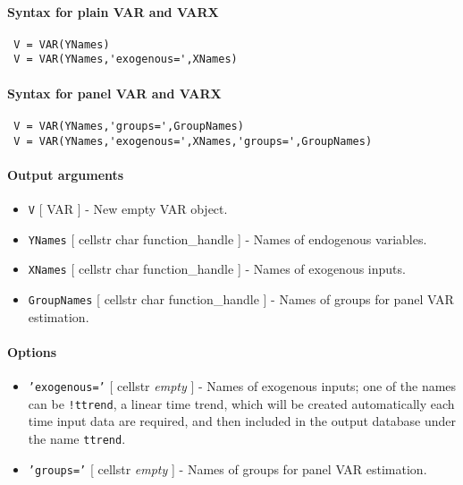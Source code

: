 


	\paragraph{Syntax for plain VAR and VARX}
 
 \begin{verbatim}
 V = VAR(YNames)
 V = VAR(YNames,'exogenous=',XNames)
 \end{verbatim}
 
 \paragraph{Syntax for panel VAR and VARX}
 
 \begin{verbatim}
 V = VAR(YNames,'groups=',GroupNames)
 V = VAR(YNames,'exogenous=',XNames,'groups=',GroupNames)
 \end{verbatim}
 
 \paragraph{Output arguments}
 
 \begin{itemize}
 \item
   \texttt{V} {[} VAR {]} - New empty VAR object.
 \item
   \texttt{YNames} {[} cellstr \textbar{} char \textbar{}
   function\_handle {]} - Names of endogenous variables.
 \item
   \texttt{XNames} {[} cellstr \textbar{} char \textbar{}
   function\_handle {]} - Names of exogenous inputs.
 \item
   \texttt{GroupNames} {[} cellstr \textbar{} char \textbar{}
   function\_handle {]} - Names of groups for panel VAR estimation.
 \end{itemize}
 
 \paragraph{Options}
 
 \begin{itemize}
 \item
   \texttt{'exogenous='} {[} cellstr \textbar{} \emph{empty} {]} - Names
   of exogenous inputs; one of the names can be \texttt{!ttrend}, a
   linear time trend, which will be created automatically each time input
   data are required, and then included in the output database under the
   name \texttt{ttrend}.
 \item
   \texttt{'groups='} {[} cellstr \textbar{} \emph{empty} {]} - Names of
   groups for panel VAR estimation.
 \end{itemize}
 
